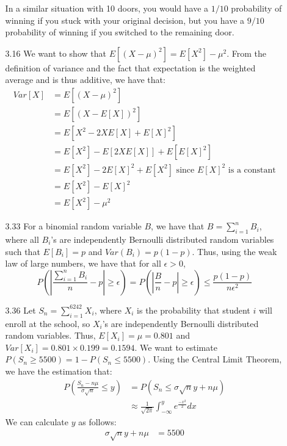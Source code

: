 \documentclass[letterpaper,12pt]{article}
\theoremstyle{definition}
\begin{document}
\begin{enumerate}
\begin{enumerate}
      In a similar situation with 10 doors, you would have a $1/10$ probability of winning if you stuck with your original decision, but you have a $9/10$ probability of winning if you switched to the remaining door.
    \item[3.16]
      We want to show that $E[(X-\mu)^2] = E[X^2] - \mu^2$. From the definition of variance and the fact that expectation is the weighted average and is thus additive, we have that:
        \begin{align*}
          Var[X] &= E[(X-\mu)^2] \\
          &= E[(X-E[X])^2] \\
          &= E[X^2 - 2XE[X] + E[X]^2] \\
          &= E[X^2] - E[2XE[X]] + E[E[X]^2] \\
          &= E[X^2] - 2E[X]^2 + E[X^2] \text{ since $E[X]^2$ is a constant} \\
          &= E[X^2] - E[X]^2 \\
          &= E[X^2] - \mu^2
        \end{align*}
    \item[3.33]
      For a binomial random variable $B$, we have that $B = \sum_{i=1}^n B_i$, where all $B_i$'s are independently Bernoulli distributed random variables such that $E[B_i] = p$ and $Var(B_i) = p(1-p)$. Thus, using the weak law of large numbers, we have that for all $\epsilon > 0$,
        \begin{equation*}
          P(|\frac{\sum_{i=1}^n B_i}{n} - p| \geq \epsilon) = P(|\frac{B}{n} - p| \geq \epsilon) \leq \frac{p(1-p)}{n\epsilon^2}
        \end{equation*}
    \item[3.36]
      Let $S_n = \sum_{i=1}^6242 X_i$, where $X_i$ is the probability that student $i$ will enroll at the school, so $X_i$'s are independently Bernoulli distributed random variables. Thus, $E[X_i]=\mu = 0.801$ and $Var[X_i] = 0.801 \times 0.199 = 0.1594$. We want to estimate $P(S_n \geq 5500) = 1 - P(S_n \leq 5500)$. Using the Central Limit Theorem, we have the estimation that:
        \begin{align*}
          P(\frac{S_n - n\mu}{\sigma\sqrt{n}} \leq y) &= P(S_n \leq \sigma\sqrt{n}y + n\mu) \\
          & \approx \frac{1}{\sqrt{2\pi}}\int_{-\infty}^y e^{\frac{-x^2}{2}}dx
        \end{align*}
      We can calculate $y$ as follows:
        \begin{align*}
          \sigma\sqrt{n}y + n\mu &= 5500 \\

\end{align*}
\end{enumerate}
\end{enumerate}
\end{document}
